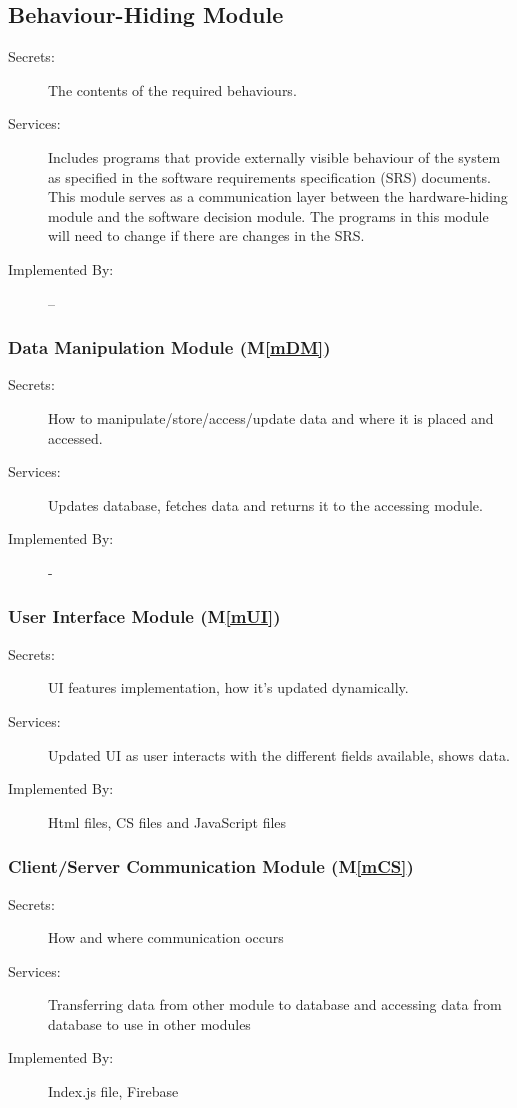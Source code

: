 \documentclass[12pt, titlepage]{article}
\newcommand{\mref}[1]{M\ref{#1}}
\begin{document}
\subsection{Behaviour-Hiding Module}

\begin{description}
\item[Secrets:]The contents of the required behaviours.
\item[Services:]Includes programs that provide externally visible behaviour of
  the system as specified in the software requirements specification (SRS)
  documents. This module serves as a communication layer between the
  hardware-hiding module and the software decision module. The programs in this
  module will need to change if there are changes in the SRS.
\item[Implemented By:] --
\end{description}


\subsubsection{Data Manipulation Module (\mref{mDM})}
\begin{description}
\item[Secrets:]How to manipulate/store/access/update data and where it is placed and accessed.
\item[Services:]Updates database, fetches data and returns it to the accessing module.
\item[Implemented By:] -
\end{description}


\subsubsection{User Interface Module (\mref{mUI})}
\begin{description}
\item[Secrets:]UI features implementation, how it's updated dynamically.
\item[Services:]Updated UI as user interacts with the different fields available, shows data.
\item[Implemented By:]Html files, CS files and JavaScript files
\end{description}


\subsubsection{Client/Server Communication Module (\mref{mCS})}
\begin{description}
\item[Secrets:]How and where communication occurs
\item[Services:]Transferring data from other module to database and accessing data from database to use in other modules
\item[Implemented By:]Index.js file, Firebase
\end{description}
\end{document}
